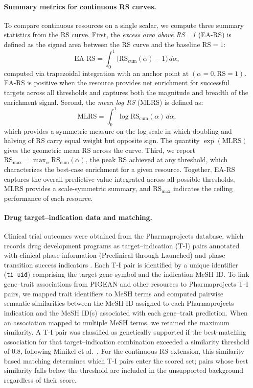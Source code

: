 \paragraph{Summary metrics for continuous RS curves.}
To compare continuous resources on a single scalar, we compute three summary statistics from the RS curve. First, the \textit{excess area above RS\,=\,1} (EA-RS) is defined as the signed area between the RS curve and the baseline $\text{RS}{=}1$:
\begin{equation}\label{eq:ea-rs}
    \text{EA-RS} = \int_0^1 \bigl(\text{RS}_{\text{cum}}(\alpha) - 1\bigr) \, d\alpha,
\end{equation}
computed via trapezoidal integration with an anchor point at $(\alpha{=}0, \text{RS}{=}1)$. EA-RS is positive when the resource provides net enrichment for successful targets across all thresholds and captures both the magnitude and breadth of the enrichment signal. Second, the \textit{mean log RS} (MLRS) is defined as:
\begin{equation}\label{eq:mlrs}
    \text{MLRS} = \int_0^1 \log \text{RS}_{\text{cum}}(\alpha) \, d\alpha,
\end{equation}
which provides a symmetric measure on the log scale in which doubling and halving of RS carry equal weight but opposite sign. The quantity $\exp(\text{MLRS})$ gives the geometric mean RS across the curve. Third, we report $\text{RS}_{\max} = \max_\alpha \text{RS}_{\text{cum}}(\alpha)$, the peak RS achieved at any threshold, which characterizes the best-case enrichment for a given resource. Together, EA-RS captures the overall predictive value integrated across all possible thresholds, MLRS provides a scale-symmetric summary, and $\text{RS}_{\max}$ indicates the ceiling performance of each resource.

\paragraph{Drug target--indication data and matching.}
Clinical trial outcomes were obtained from the Pharmaprojects database, which records drug development programs as target--indication (T-I) pairs annotated with clinical phase information (Preclinical through Launched) and phase transition success indicators \cite{minikel_refining_2024}. Each T-I pair is identified by a unique identifier (\texttt{ti\_uid}) comprising the target gene symbol and the indication MeSH ID. To link gene--trait associations from PIGEAN and other resources to Pharmaprojects T-I pairs, we mapped trait identifiers to MeSH terms and computed pairwise semantic similarities between the MeSH ID assigned to each Pharmaprojects indication and the MeSH ID(s) associated with each gene--trait prediction. When an association mapped to multiple MeSH terms, we retained the maximum similarity. A T-I pair was classified as genetically supported if the best-matching association for that target--indication combination exceeded a similarity threshold of $0.8$, following Minikel et al.\ \cite{minikel_refining_2024}. For the continuous RS extension, this similarity-based matching determines which T-I pairs enter the scored set; pairs whose best similarity falls below the threshold are included in the unsupported background regardless of their score.

